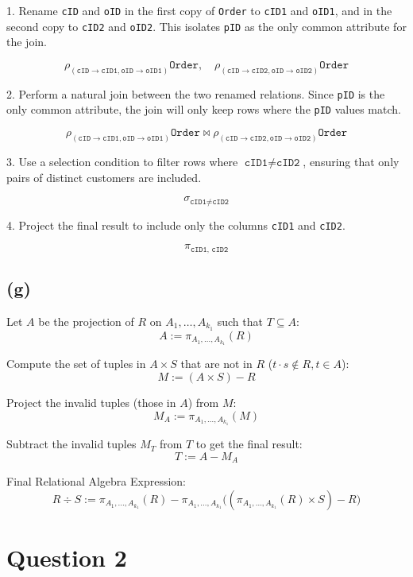 \documentclass{article}
\begin{document}
1. Rename \texttt{cID} and \texttt{oID} in the first copy of \texttt{Order} to \texttt{cID1} and \texttt{oID1}, and in the second copy to \texttt{cID2} and \texttt{oID2}. This isolates \texttt{pID} as the only common attribute for the join.

$$
    \rho_{(\texttt{cID} \rightarrow \texttt{cID1}, \texttt{oID} \rightarrow \texttt{oID1})} \texttt{Order}, \quad \rho_{(\texttt{cID} \rightarrow \texttt{cID2}, \texttt{oID} \rightarrow \texttt{oID2})} \texttt{Order}
$$

2. Perform a natural join between the two renamed relations. Since \texttt{pID} is the only common attribute, the join will only keep rows where the \texttt{pID} values match.

$$
    \rho_{(\texttt{cID} \rightarrow \texttt{cID1}, \texttt{oID} \rightarrow \texttt{oID1})} \texttt{Order} \bowtie \rho_{(\texttt{cID} \rightarrow \texttt{cID2}, \texttt{oID} \rightarrow \texttt{oID2})} \texttt{Order}
$$

3. Use a selection condition to filter rows where $\texttt{cID1} \neq \texttt{cID2}$, ensuring that only pairs of distinct customers are included.

$$
    \sigma_{\texttt{cID1} \neq \texttt{cID2}}
$$

4. Project the final result to include only the columns \texttt{cID1} and \texttt{cID2}.

$$
    \pi_{\texttt{cID1, cID2}}
$$

\newpage
\subsection*{(g)}
Let $ A $ be the projection of $ R $ on $ A_1, \ldots, A_{k_1} $ such that $T\subseteq A$:
$$
    A := \pi_{A_1, \ldots, A_{k_1}}(R)
$$

Compute the set of tuples in $ A \times S $ that are not in $ R $ ($t\cdot s\notin R, t\in A$):
$$
    M := (A \times S) - R
$$

Project the invalid tuples (those in $ A $) from $ M $:
$$
    M_A := \pi_{A_1, \ldots, A_{k_1}}(M)
$$

Subtract the invalid tuples $ M_T $ from $ T $ to get the final result:
$$
    T := A - M_A
$$

Final Relational Algebra Expression:
$$
    R \div S := \pi_{A_1, \ldots, A_{k_1}}(R) - \pi_{A_1, \ldots, A_{k_1}} \bigg( ( \pi_{A_1, \ldots, A_{k_1}}(R) \times S ) - R \bigg)
$$

\newpage
\section*{Question 2}
\end{document}
